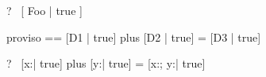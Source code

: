 \begin{zed}
  \vdash?~ [ Foo | true ] 
\end{zed}


\begin{zedrule}{proviso}
  \proviso [D3 | true] == [D1 | true] \schemamerge [D2 | true]
\derives
  [D1 | true] plus [D2 | true] = [D3 | true]
\end{zedrule}

\begin{zed}
  \vdash?~ [x:\nat | true] plus [y:\nat | true] = [x:\nat; y:\nat | true]
\end{zed}
